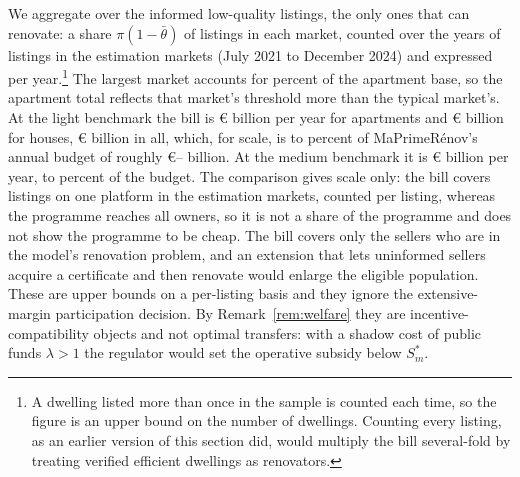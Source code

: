 We aggregate over the informed low-quality listings, the only ones that can renovate: a share $\pi(1-\bar\theta)$ of listings in each market, counted over the \attSampleYears{} years of listings in the estimation markets (July 2021 to December 2024) and expressed per year.\footnote{A dwelling listed more than once in the sample is counted each time, so the figure is an upper bound on the number of dwellings. Counting every listing, as an earlier version of this section did, would multiply the bill several-fold by treating verified efficient dwellings as renovators.} The largest market accounts for \attTopMarketShareApt{} percent of the apartment base, so the apartment total reflects that market's threshold more than the typical market's. At the light benchmark the bill is \euro{}\attScBaseCostTwoFiftyApt{} billion per year for apartments and \euro{}\attScBaseCostTwoFiftyHouse{} billion for houses, \euro{}\attScCostBaseTotTwoFifty{} billion in all, which, for scale, is \attScCostBaseTotTwoFiftyLo{} to \attScCostBaseTotTwoFiftyHi{} percent of MaPrimeR\'enov's annual budget of roughly \euro{}\attBudgetLo{}--\attBudgetHi{} billion. %
At the medium benchmark it is \euro{}\attScCostBaseTotFiveHundred{} billion per year, \attScCostBaseTotFiveHundredLo{} to \attScCostBaseTotFiveHundredHi{} percent of the budget. The comparison gives scale only: the bill covers listings on one platform in the estimation markets, counted per listing, whereas the programme reaches all owners, so it is not a share of the programme and does not show the programme to be cheap. The bill covers only the sellers who are in the model's renovation problem, and an extension that lets uninformed sellers acquire a certificate and then renovate would enlarge the eligible population. These are upper bounds on a per-listing basis and they ignore the extensive-margin participation decision. By Remark~\ref{rem:welfare} they are incentive-compatibility objects and not optimal transfers: with a shadow cost of public funds $\lambda>1$ the regulator would set the operative subsidy below $S^*_m$.
